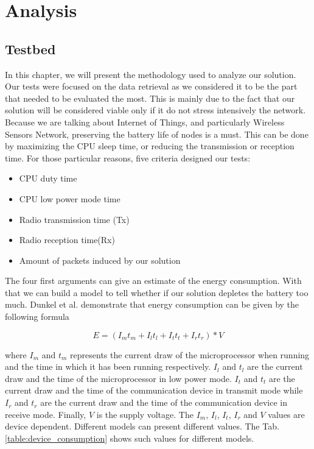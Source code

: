 \part{Analysis}  \label{part:analysis}

\chapter{Testbed}

In this chapter, we will present the methodology used to analyze our solution. Our tests were focused on the data retrieval as we considered it to be the part that needed to be evaluated the most. This is mainly due to the fact that our solution will be considered viable only if it do not stress intensively the network. Because we are talking about Internet of Things, and particularly Wireless Sensors Network, preserving the battery life of nodes is a must. This can be done by maximizing the CPU sleep time, or reducing the transmission or reception time. For those particular reasons, five criteria designed our tests:

\begin{itemize}
  \item CPU duty time
  \item CPU low power mode time
  \item Radio transmission time (Tx)
  \item Radio reception time(Rx)
  \item Amount of packets induced by our solution \\
\end{itemize}

The four first arguments can give an estimate of the energy consumption. With that we can build a model to tell whether if our solution depletes the battery too much. Dunkel et al. \cite{dunkels2007software} demonstrate that energy consumption can be given by the following formula

\begin{equation}
  E = (I_m t_m + I_l t_l + I_t t_t + I_r t_r) * V
\end{equation}

where $I_m$ and $t_m$ represents the current draw of the microprocessor when running and the time in which it has been running respectively. $I_l$ and $t_l$  are the current draw and the time of the microprocessor in low power mode. $I_t$ and $t_t$ are the current draw and the time of the communication device in transmit mode while $I_r$ and $t_r$ are the current draw and the time of the communication device in receive mode. Finally, $V$ is the supply voltage. The $I_m$, $I_l$, $I_t$, $I_r$ and $V$ values are device dependent. Different models can present different values. The Tab.\ref{table:device_consumption} shows such values for different models.\\

